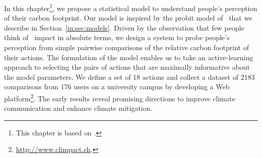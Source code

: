 In this chapter\footnote{This chapter is based on \citet{kristof2019user}.}, we propose a statistical model to understand people's perception of their carbon footprint.
Our model is inspired by the probit model of~\citet{thurstone1927method} that we describe in Section~\ref{in:sec:models}.
Driven by the observation that few people think of \COtwo\ impact in absolute terms, we design a system to probe people's perception from simple pairwise comparisons of the relative carbon footprint of their actions.
The formulation of the model enables us to take an active-learning approach to selecting the pairs of actions that are maximally informative about the model parameters.
We define a set of 18 actions and collect a dataset of 2183 comparisons from 176 users on a university campus by developing a Web platform\footnote{\href{http://www.climpact.ch}{http://www.climpact.ch}.}.
The early results reveal promising directions to improve climate communication and enhance climate mitigation.
